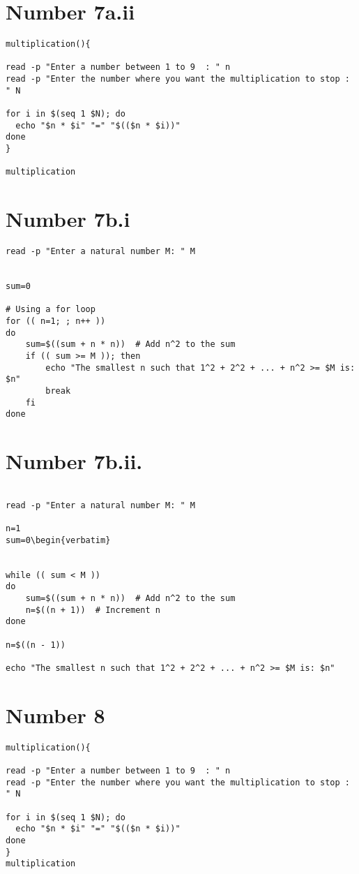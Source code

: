 \documentclass{article}
\begin{document}
\section*{Number 7a.ii}

\begin{verbatim}
multiplication(){

read -p "Enter a number between 1 to 9  : " n
read -p "Enter the number where you want the multiplication to stop :  " N

for i in $(seq 1 $N); do
  echo "$n * $i" "=" "$(($n * $i))"
done
}

multiplication
\end{verbatim}
\section*{Number 7b.i}
\begin{verbatim}
read -p "Enter a natural number M: " M


sum=0

# Using a for loop
for (( n=1; ; n++ ))
do
    sum=$((sum + n * n))  # Add n^2 to the sum
    if (( sum >= M )); then
        echo "The smallest n such that 1^2 + 2^2 + ... + n^2 >= $M is: $n"
        break
    fi
done
\end{verbatim}

\section*{Number 7b.ii.}
\begin{verbatim}

read -p "Enter a natural number M: " M

n=1
sum=0\begin{verbatim}


while (( sum < M ))
do
    sum=$((sum + n * n))  # Add n^2 to the sum
    n=$((n + 1))  # Increment n
done

n=$((n - 1))

echo "The smallest n such that 1^2 + 2^2 + ... + n^2 >= $M is: $n"
\end{verbatim}

\section*{Number 8}

\begin{verbatim}
multiplication(){

read -p "Enter a number between 1 to 9  : " n
read -p "Enter the number where you want the multiplication to stop :  " N

for i in $(seq 1 $N); do
  echo "$n * $i" "=" "$(($n * $i))"
done
}
multiplication
\end{verbatim}
\end{document}
